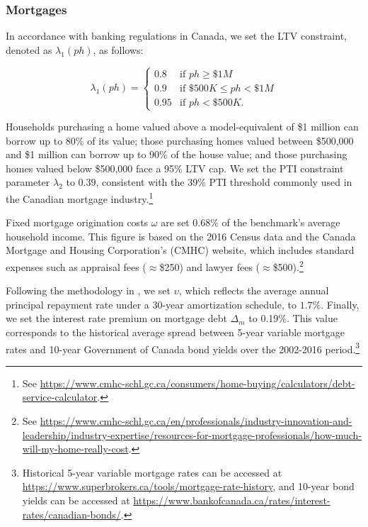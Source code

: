 \documentclass[parskip=full]{article}
\begin{document}
\subsubsection{Mortgages}

In accordance with banking regulations in Canada, we set the LTV constraint, denoted as $\lambda_{1}(ph)$, as follows:

\begin{equation*}
\lambda_{1}(ph) = \begin{cases}
0.8 &\text{if $ph\geq \$1M$}\\
0.9 &\text{if $\$500K\leq ph< \$1M$}\\
0.95 &\text{if $ph < \$500K$}.
\end{cases}
\end{equation*}

\noindent Households purchasing a home valued above a model-equivalent of \$1 million can borrow up to 80\% of its value; those purchasing homes valued between \$500,000 and \$1 million can borrow up to 90\% of the house value; and those purchasing homes valued below \$500,000 face a 95\% LTV cap. We set the PTI constraint parameter $\lambda_{2}$ to $0.39$, consistent with the 39\% PTI threshold commonly used in the Canadian mortgage industry.\footnote{See \url{https://www.cmhc-schl.gc.ca/consumers/home-buying/calculators/debt-service-calculator}.}

Fixed mortgage origination costs $\omega$ are set $0.68\%$ of the benchmark's average household income. This figure is based on the 2016 Census data and the Canada Mortgage and Housing Corporation's (CMHC) website, which includes standard expenses such as appraisal fees ($\approx$\$250) and lawyer fees ($\approx$\$500).\footnote{See \url{https://www.cmhc-schl.gc.ca/en/professionals/industry-innovation-and-leadership/industry-expertise/resources-for-mortgage-professionals/how-much-will-my-home-really-cost}.}

Following the methodology in \citet{kkk-2021}, we set $\upsilon$, which reflects the average annual principal repayment rate under a 30-year amortization schedule, to $1.7\%$. Finally, we set the interest rate premium on mortgage debt $\Delta_{m}$ to 0.19\%. This value corresponds to the historical average spread between 5-year variable mortgage rates and 10-year Government of Canada bond yields over the 2002-2016 period.\footnote{Historical 5-year variable mortgage rates can be accessed at \url{https://www.superbrokers.ca/tools/mortgage-rate-history}, and 10-year bond yields can be accessed at \url{https://www.bankofcanada.ca/rates/interest-rates/canadian-bonds/}.}
\end{document}
